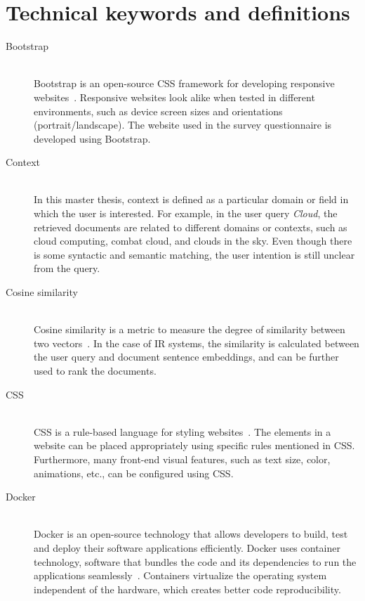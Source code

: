 \appendix
\chapter{Technical keywords and definitions}
\label{appendix:A}
\begin{description}
	
	
		\item[Bootstrap] \hfill \\ Bootstrap is an open-source \ac{CSS} framework for developing responsive websites~\cite{simplilearnWhatBootstrap}.
	Responsive websites look alike when tested in different environments, such as device screen sizes and orientations (portrait/landscape). The website
	used in the survey questionnaire is developed using Bootstrap.
	
	\item[Context] \hfill \\ In this master thesis, context is defined as a particular domain or field in which the user is interested. For example, in the user query \emph{Cloud}, the retrieved documents are related to different domains or contexts, such as cloud computing, combat cloud, and clouds in the sky. Even though there is some syntactic and semantic matching, the user intention is still unclear from the query.

		\item[Cosine similarity] \hfill \\     Cosine similarity is a metric to measure the degree of similarity between two vectors~\cite{lahitani2016cosine}. In the case of IR systems, the similarity is calculated between the user query and document sentence embeddings, and can be further used to rank the documents.
		
		
		 \item[CSS] \hfill \\ 
	
	\ac{CSS} is a rule-based language for styling websites~\cite{mozillaWhatCSS}. The elements in a website can be placed appropriately using specific rules mentioned in \ac{CSS}. Furthermore, many front-end visual features, such as text size, color, animations, etc., can be configured using \ac{CSS}.
	
		\item[Docker] \hfill \\ Docker is an open-source technology that allows developers to build, test and
	deploy their software applications efficiently. Docker uses container technology, software that bundles the code and its dependencies to run the applications seamlessly~\cite{dockerWhatContainer}. Containers virtualize the operating
	system independent of the hardware, which creates better code reproducibility.  
	

\end{description}

